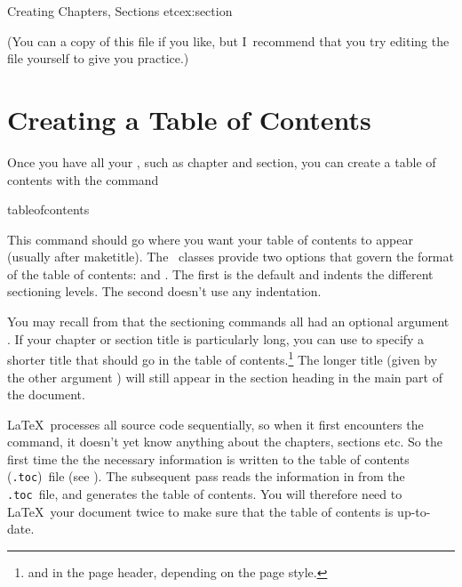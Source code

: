 \begin{exercise}{Creating Chapters, Sections etc}{ex:section}
\begin{bcode}
\begin{alltt}
\end{alltt}
\end{bcode}

(You can  a copy of this file if you like, but
I~recommend that you try editing the file yourself to give you
practice.)
\end{exercise}


\section{Creating a Table of Contents}
\label{sec:toc}

Once you have all your ,
such as \gls{chapter} and \gls{section},
you can create a table of contents with the command
\begin{definition}
\gls{tableofcontents}
\end{definition}%
This command should go where you want your table of
contents to appear (usually after \gls{maketitle}). The \koma\ classes provide two
options that govern the format of the table of contents:
 and . The first is the
default and indents the different sectioning levels. The second
doesn't use any indentation.


\begin{codeS}
\end{codeS}

You may recall from  that
the sectioning commands all had an optional argument .  If your chapter or section title is particularly long, you
can use  to specify a shorter title that should go
in the table of contents.\footnote{\label{ftn:header}and in the page header, depending
on the page style.}  The longer title (given by the other
argument ) will still appear in the section heading in
the main part of the document.

\LaTeX\ processes all source code sequentially, so when it first
encounters the  command, it doesn't yet
know anything about the chapters, sections etc.  So the first time
the  the necessary
information is written to the table of contents 
(\texttt{.toc})\indexTOC\ file (see ).  The subsequent pass reads the
information in from the \texttt{.toc}\indexTOC\ file, and generates
the table of contents.  You will therefore need to \LaTeX\ your
document twice to make sure that the table of contents is
up-to-date.

